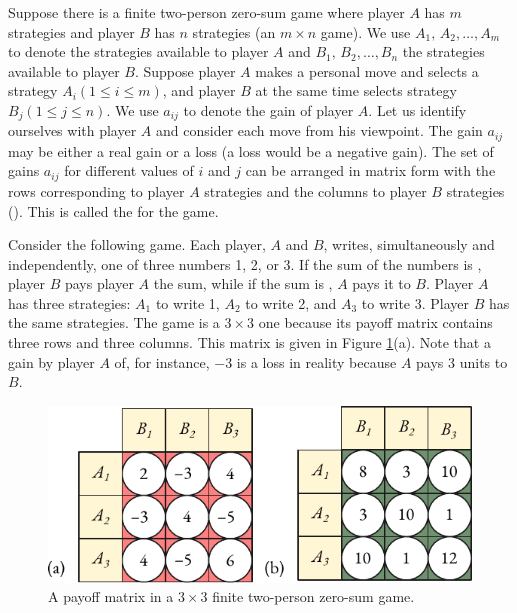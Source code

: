 Suppose there is a finite two-person zero-sum game where player
$A$ has $m$ strategies and player $B$ has $n$ strategies (an $m \times n$ game). We use $A_{1}, \, A_{2}, \ldots, A_{m}$ to denote the strategies available to player $A$ and $B_{1}, \, B_{2}, \ldots, B_{n}$ the strategies available to player $B$. Suppose player $A$ makes a personal move and selects a strategy $A_{i} (1 \leqslant i \leqslant m)$, and player $B$ at the same time selects strategy $B_{j} (1 \leqslant j \leqslant n)$. We use $a_{ij}$ to denote the gain of player $A$. Let us identify ourselves with player $A$ and consider each move from his viewpoint. The gain $a_{ij}$ may be either a real gain or a loss (a loss would be a negative gain). The set of gains $a_{ij}$ for different values of $i$ and $j$ can be arranged in matrix form with the rows corresponding to player $A$ strategies and the columns to player $B$ strategies (). This is called the  for the game.

Consider the following game. Each player, $A$ and $B$, writes, simultaneously
and independently, one of three numbers 1, 2, or 3. If the sum of
the numbers is , player $B$ pays player $A$ the sum, while if the sum is , $A$ pays it to $B$. Player $A$ has three strategies: $A_{1}$ to write 1, $A_{2}$ to write 2, and $A_{3}$ to write 3. Player $B$ has the same strategies. The game is a $3 \times 3$ one because its payoff matrix contains three rows and three columns. This matrix is given in Figure \ref{twoplayer2}(a). Note that a gain by player $A$ of, for instance, $-3$ is a loss in reality because $A$ pays 3 units to $B$. 

 \begin{figure}[!h]
 \centering
 \includegraphics[width=0.85\tfwidth]{figures/two-player2.pdf}
\caption{A payoff matrix in a $3 \times 3$ finite two-person zero-sum game.\label{twoplayer2}}
 \end{figure}


